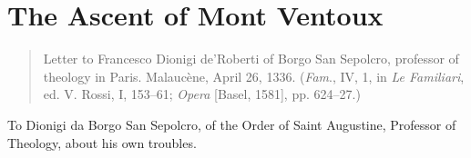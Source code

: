 
\author{Francesco Petrarca (Petrarch)}
\chapter{The Ascent of Mont Ventoux}

\begin{quote} Letter to Francesco Dionigi de'Roberti of Borgo
San Sepolcro, professor of theology in Paris. Malauc\`{e}ne, April 26,
1336. (\textit{Fam}., IV, 1, in \textit{Le Familiari}, ed. V. Rossi,
I, 153--61; \textit{Opera} [Basel, 1581], pp. 624--27.) \end{quote}

\begin{center} To Dionigi da Borgo San Sepolcro, of the Order of Saint
Augustine, Professor of Theology, about his own troubles. \end{center}

